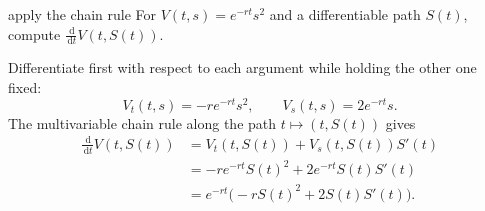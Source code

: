 \documentclass[10pt]{article}
\newcommand{\1}{\mathbf 1}
\newcommand{\dd}{\,\mathrm d}
\theoremstyle{definition}
\begin{document}
\begin{studentexercise}{apply the chain rule}
For $V(t,s)=e^{-rt}s^2$ and a differentiable path $S(t)$, compute
$\frac{\dd}{\dd t}V(t,S(t))$.
\end{studentexercise}
\begin{shortsolution}
Differentiate first with respect to each argument while holding the other one
fixed:
\[
V_t(t,s)=-re^{-rt}s^2,
\qquad
V_s(t,s)=2e^{-rt}s.
\]
The multivariable chain rule along the path $t\mapsto(t,S(t))$ gives
\begin{align*}
\frac{\dd}{\dd t}V(t,S(t))
&=V_t(t,S(t))+V_s(t,S(t))S'(t)\\
&=-re^{-rt}S(t)^2+2e^{-rt}S(t)S'(t)\\
&=e^{-rt}\bigl(-rS(t)^2+2S(t)S'(t)\bigr).
\end{align*}
\end{shortsolution}
\end{document}
